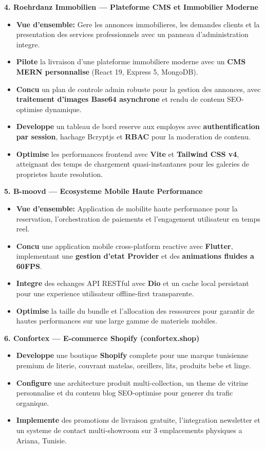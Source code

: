 \documentclass[10pt, letterpaper]{article}
\newenvironment{highlights}{
\begin{itemize}[leftmargin=12pt, itemsep=2pt]
}{
\end{itemize}
}
\begin{document}
\textbf{4. Roehrdanz Immobilien --- Plateforme CMS et Immobilier Moderne}
\begin{highlights}
\item \textbf{Vue d'ensemble:} Gere les annonces immobilieres, les demandes clients et la presentation des services professionnels avec un panneau d'administration integre.
\item \textbf{Pilote} la livraison d'une plateforme immobiliere moderne avec un \textbf{CMS MERN personnalise} (React 19, Express 5, MongoDB).
\item \textbf{Concu} un plan de controle admin robuste pour la gestion des annonces, avec \textbf{traitement d'images Base64 asynchrone} et rendu de contenu SEO-optimise dynamique.
\item \textbf{Developpe} un tableau de bord reserve aux employes avec \textbf{authentification par session}, hachage Bcryptjs et \textbf{RBAC} pour la moderation de contenu.
\item \textbf{Optimise} les performances frontend avec \textbf{Vite} et \textbf{Tailwind CSS v4}, atteignant des temps de chargement quasi-instantanes pour les galeries de proprietes haute resolution.
\end{highlights}

\textbf{5. B-moovd --- Ecosysteme Mobile Haute Performance}
\begin{highlights}
\item \textbf{Vue d'ensemble:} Application de mobilite haute performance pour la reservation, l'orchestration de paiements et l'engagement utilisateur en temps reel.
\item \textbf{Concu} une application mobile cross-platform reactive avec \textbf{Flutter}, implementant une \textbf{gestion d'etat Provider} et des \textbf{animations fluides a 60FPS}.
\item \textbf{Integre} des echanges API RESTful avec \textbf{Dio} et un cache local persistant pour une experience utilisateur offline-first transparente.
\item \textbf{Optimise} la taille du bundle et l'allocation des ressources pour garantir de hautes performances sur une large gamme de materiels mobiles.
\end{highlights}

\textbf{6. Confortex --- E-commerce Shopify (confortex.shop)}
\begin{highlights}
\item \textbf{Developpe} une boutique \textbf{Shopify} complete pour une marque tunisienne premium de literie, couvrant matelas, oreillers, lits, produits bebe et linge.
\item \textbf{Configure} une architecture produit multi-collection, un theme de vitrine personnalise et du contenu blog SEO-optimise pour generer du trafic organique.
\item \textbf{Implemente} des promotions de livraison gratuite, l'integration newsletter et un systeme de contact multi-showroom sur 3 emplacements physiques a Ariana, Tunisie.
\end{highlights}
\end{document}
